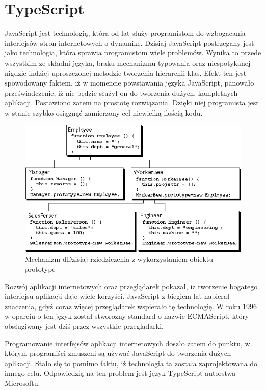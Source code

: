 \chapter{TypeScript}
JavaScript jest technologią, która od lat służy programistom do wzbogacania interfejsów stron internetowych o dynamikę. Dzisiaj JavaScript postrzegany jest jako technologia, która sprawia programistom wiele problemów. Wynika to przede wszystkim ze składni języka, braku mechanizmu typowania oraz niespotykanej nigdzie indziej  uproszczonej metodzie tworzenia hierarchii klas. Efekt ten jest spowodowany faktem, iż w momencie powstawania języka JavaScript, panowało przeświadczenie, iż nie będzie służył on do tworzenia dużych, kompletnych aplikacji. Postawiono zatem na prostotę rozwiązania. Dzięki niej programista jest w stanie szybko osiągnąć zamierzony cel niewielką ilością kodu.

\begin{figure}[h]
	\includegraphics[width=140mm]{./img/javascript-inheritance.png}
	\caption{Mechanizm dDzisiaj rziedziczenia z wykorzystaniem obiektu prototype}
	\label{fig:javascript-inheritance}
\end{figure}

Rozwój aplikacji internetowych oraz przeglądarek pokazał, iż tworzenie bogatego interfejsu aplikacji daje wiele korzyści. JavaScript z biegiem lat nabierał znaczenia, gdyż coraz więcej przeglądarek wspierało tę technologię. W roku 1996 w oparciu o ten język został stworozny standard o nazwie ECMAScript, który obsługiwany jest dziś przez wszystkie przeglądarki. 

Programowanie interfejsów aplikacji internetowych doszło zatem do punktu, w którym programiści zmuszeni są używać JavaScript do tworzenia dużych aplikacji. Stało się to pomimo faktu, iż technologia ta została zaprojektowana do innego celu. Odpowiedzią na ten problem jest język TypeScript autorstwa Microsoftu.

